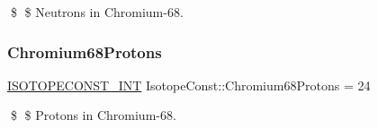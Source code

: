 \$ \$ Neutrons in Chromium-\/68. \mbox{\label{group___isotope_const-_chromium-_cr68_ga58fb4af86b9194c1e672664cc5801c34}} 
\subsubsection{\texorpdfstring{Chromium68\+Protons}{Chromium68Protons}}
{\footnotesize\ttfamily \mbox{\hyperlink{group___isotope_const-_macros_ga5f18360b3e99483a35c32d789e62621c}{I\+S\+O\+T\+O\+P\+E\+C\+O\+N\+S\+T\+\_\+\+I\+NT}} Isotope\+Const\+::\+Chromium68\+Protons = 24}

\$ \$ Protons in Chromium-\/68. 